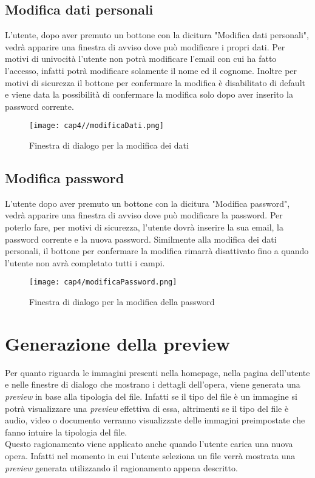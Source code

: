 \subsection{Modifica dati personali}
\label{subsec:modifica-dati-personali}

L'utente, dopo aver premuto un bottone con la dicitura "Modifica dati personali", vedrà apparire una finestra di avviso dove può modificare i propri dati. Per motivi di univocità l'utente non potrà modificare l'email con cui ha fatto l'accesso, infatti potrà modificare solamente il nome ed il cognome. Inoltre per motivi di sicurezza il bottone per confermare la modifica è disabilitato di default e viene data la possibilità di confermare la modifica solo dopo aver inserito la password corrente.
\begin{figure}[H]
	\begin{center}
		\texttt{[image: cap4//modificaDati.png]}
		\caption{Finestra di dialogo per la modifica dei dati}
	\end{center}
\end{figure}

\subsection{Modifica password}
\label{subsec:modifica-password}

L'utente dopo aver premuto un bottone con la dicitura "Modifica password", vedrà apparire una finestra di avviso dove può modificare la password. Per poterlo fare, per motivi di sicurezza, l'utente dovrà inserire la sua email, la password corrente e la nuova password. Similmente alla modifica dei dati personali, il bottone per confermare la modifica rimarrà disattivato fino a quando l'utente non avrà completato tutti i campi.
\begin{figure}[H]
	\begin{center}
		\texttt{[image: cap4/modificaPassword.png]}
		\caption{Finestra di dialogo per la modifica della password}
	\end{center}
\end{figure}

\section{Generazione della preview}
\label{sec:generazione-preview}

Per quanto riguarda le immagini presenti nella homepage, nella pagina dell'utente e nelle finestre di dialogo che mostrano i dettagli dell'opera, viene generata una \textit{preview} in base alla tipologia del file. Infatti se il tipo del file è un immagine si potrà visualizzare una \textit{preview} effettiva di essa, altrimenti se il tipo del file è audio, video o documento verranno visualizzate delle immagini preimpostate che fanno intuire la tipologia del file.\\
Questo ragionamento viene applicato anche quando l'utente carica una nuova opera. Infatti nel momento in cui l'utente seleziona un file verrà mostrata una \textit{preview} generata utilizzando il ragionamento appena descritto.
